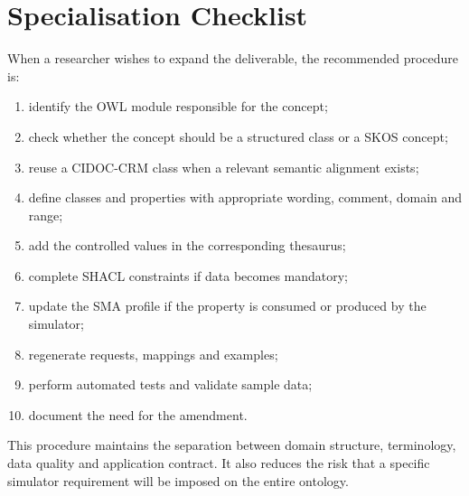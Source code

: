 \documentclass{article}
\begin{document}
\clearpage
\section{Specialisation Checklist}

When a researcher wishes to expand the deliverable, the recommended procedure is:

\begin{enumerate}
\item identify the OWL module responsible for the concept;
\item check whether the concept should be a structured class or a SKOS concept;
\item reuse a CIDOC-CRM class when a relevant semantic alignment exists;
\item define classes and properties with appropriate wording, comment, domain and range;
\item add the controlled values in the corresponding thesaurus;
\item complete SHACL constraints if data becomes mandatory;
\item update the SMA profile if the property is consumed or produced by the simulator;
\item regenerate requests, mappings and examples;
\item perform automated tests and validate sample data;
\item document the need for the amendment.
\end{enumerate}

This procedure maintains the separation between domain structure, terminology, data quality and application contract. It also reduces the risk that a specific simulator requirement will be imposed on the entire ontology.
\end{document}
